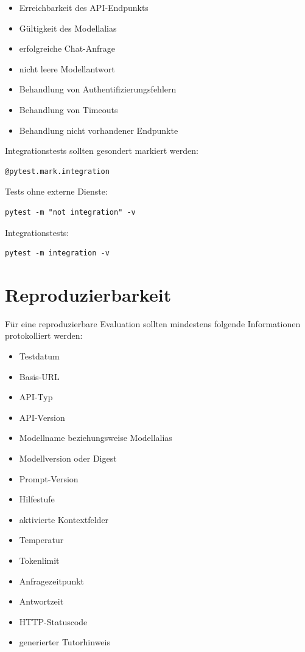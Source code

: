 \documentclass[11pt,a4paper,oneside,ngerman]{memoir}
\begin{document}
\begin{itemize}
    \item Erreichbarkeit des API-Endpunkts
    \item Gültigkeit des Modellalias
    \item erfolgreiche Chat-Anfrage
    \item nicht leere Modellantwort
    \item Behandlung von Authentifizierungsfehlern
    \item Behandlung von Timeouts
    \item Behandlung nicht vorhandener Endpunkte
\end{itemize}

Integrationstests sollten gesondert markiert werden:

\begin{verbatim}
@pytest.mark.integration
\end{verbatim}

Tests ohne externe Dienste:

\begin{verbatim}
pytest -m "not integration" -v
\end{verbatim}

Integrationstests:

\begin{verbatim}
pytest -m integration -v
\end{verbatim}

\section{Reproduzierbarkeit}

Für eine reproduzierbare Evaluation sollten mindestens folgende Informationen protokolliert werden:

\begin{itemize}
    \item Testdatum
    \item Basis-URL
    \item API-Typ
    \item API-Version
    \item Modellname beziehungsweise Modellalias
    \item Modellversion oder Digest
    \item Prompt-Version
    \item Hilfestufe
    \item aktivierte Kontextfelder
    \item Temperatur
    \item Tokenlimit
    \item Anfragezeitpunkt
    \item Antwortzeit
    \item HTTP-Statuscode
    \item generierter Tutorhinweis
\end{itemize}
\end{document}
